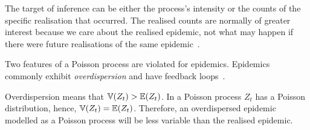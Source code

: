 \documentclass[thesis.tex]{subfiles}
\begin{document}
The target of inference can be either the process's intensity or the counts of the specific realisation that occurred.
The realised counts are normally of greater interest because we care about the realised epidemic, not what may happen if there were future realisations of the same epidemic~\autocites{beckerDependent}{brookmeyerMethod}.

Two features of a Poisson process are violated for epidemics.
Epidemics commonly exhibit \emph{overdispersion} and have feedback loops~\autocite{beckerDependent}.

Overdispersion means that $\operatorname{\mathbb{V}}(Z_t) > \operatorname{\mathbb{E}}(Z_t)$.
In a Poisson process $Z_t$ has a Poisson distribution, hence, $\operatorname{\mathbb{V}}(Z_t) = \operatorname{\mathbb{E}}(Z_t)$.
Therefore, an overdispersed epidemic modelled as a Poisson process will be less variable than the realised epidemic.

\end{document}
